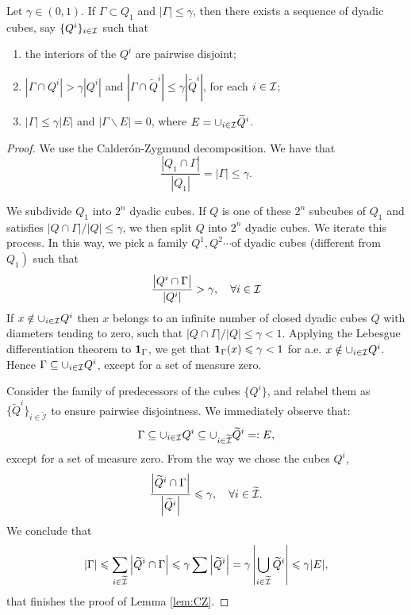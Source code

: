 	
	\begin{lemma}\label{lem:CZ}
		Let $\gamma\in (0,1)$. If $\Gamma\subset Q_1$ and $|\Gamma|\leq \gamma$, then there exists a sequence of dyadic cubes, say $\{Q^i\}_{i\in {\mathcal I}}$ such that 
		\begin{enumerate}
			\item the interiors of the $Q^i$ are pairwise disjoint; 
			\item $|\Gamma \cap Q^i|>\gamma |Q^i|$ and $|\Gamma \cap \widetilde{Q}^i|\leq \gamma |\widetilde{Q}^i|$, for each $i\in {\mathcal I}$; 
			\item $|\Gamma|\leq \gamma |E|$ and $|\Gamma \backslash E|=0$, where $E=\cup_{i\in {\mathcal I}} \widetilde{Q}^i$. 
		\end{enumerate}
	\end{lemma}
\begin{proof}
    We use the Calderón-Zygmund decomposition. We have that
$$
\frac{\left|Q_1 \cap \Gamma\right|}{\left|Q_1\right|}=|\Gamma| \leq \gamma.
$$

We subdivide $Q_1$ into $2^n$ dyadic cubes. If $Q$ is one of these $2^n$ subcubes of $Q_1$ and satisfies $|Q \cap \Gamma| /|Q| \leq \gamma$, we then split $Q$ into $2^n$ dyadic cubes. We iterate this process. In this way, we pick a family $Q^1, Q^2\cdots$of dyadic cubes (different from $\left.Q_1\right)$ such that
$$
\frac{\left|Q^i \cap \Gamma\right|}{\left|Q^i\right|}>\gamma, \quad \forall i\in {\mathcal I}
$$
If $x \notin \cup_{i\in {\mathcal I}} Q^i$ then $x$ belongs to an infinite number of closed dyadic cubes $Q$ with diameters tending to zero, such that $|Q \cap \Gamma| /|Q| \leq \gamma<1$. Applying the Lebesgue differentiation theorem to ${\mathbf{1}}_\Gamma$, we get that ${\mathbf{1}}_\Gamma(x) \leqslant \gamma<1$ for a.e. $x \notin \cup_{i\in {\mathcal I}} Q^i$. Hence $\Gamma \subseteq \cup_{i\in {\mathcal I}} Q^i$, except for a set of measure zero.

Consider the family of predecessors of the cubes $\{Q^i\}$, and relabel them as $\{\widetilde{Q}^i\}_{i \in \widetilde{\mathcal{I}}}$ to ensure pairwise disjointness. We immediately observe that:
\[
    \Gamma \subseteq \cup_{i \in {\mathcal I}} Q^i \subseteq \cup_{i \in \widetilde{{\mathcal I}}} \widetilde{Q}^i=: E, 
\]
except for a set of measure zero. From the way we chose the cubes $Q^i$,
$$
\frac{\left|\widetilde{Q}^i \cap \Gamma\right|}{\left|\widetilde{Q}^i\right|} \leqslant \gamma, \quad \forall i\in \widetilde{{\mathcal I}}.
$$
We conclude that
$$
|\Gamma| \leqslant \sum_{i\in \widetilde{{\mathcal I}}}\left|\widetilde{Q}^i \cap \Gamma\right| \leqslant \gamma \sum\left|\widetilde{Q}^i\right|=\gamma\left|\bigcup _{i\in\widetilde{{\mathcal I}}}\widetilde{Q}^i\right| \leqslant \gamma|E|,
$$
that finishes the proof of Lemma \ref{lem:CZ}. 
\end{proof}
 

